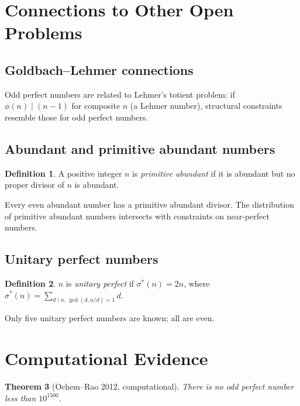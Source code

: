 \documentclass[12pt,a4paper]{amsart}
\newtheorem{theorem}{Theorem}[section]
\theoremstyle{definition}
\newtheorem{definition}[theorem]{Definition}
\theoremstyle{remark}
\begin{document}
\section{Connections to Other Open Problems}

\subsection{Goldbach--Lehmer connections}

Odd perfect numbers are related to Lehmer's totient problem: if $\phi(n) \mid (n-1)$
for composite $n$ (a Lehmer number), structural constraints resemble those for
odd perfect numbers.

\subsection{Abundant and primitive abundant numbers}

\begin{definition}
A positive integer $n$ is \emph{primitive abundant} if it is abundant but
no proper divisor of $n$ is abundant.
\end{definition}

Every even abundant number has a primitive abundant divisor.
The distribution of primitive abundant numbers intersects with constraints
on near-perfect numbers.

\subsection{Unitary perfect numbers}

\begin{definition}
$n$ is \emph{unitary perfect} if $\sigma^*(n) = 2n$, where
$\sigma^*(n) = \sum_{d \mid n,\, \gcd(d,n/d)=1} d$.
\end{definition}

Only five unitary perfect numbers are known; all are even.

\section{Computational Evidence}

\begin{theorem}[Ochem--Rao 2012, computational]
There is no odd perfect number less than $10^{1500}$.
\end{theorem}
\end{document}
